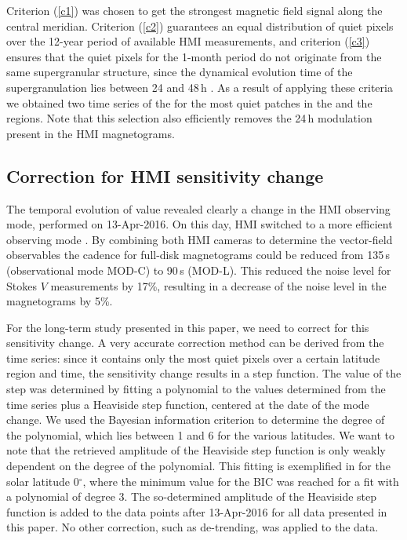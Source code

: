 \documentclass{aa}
\begin{document}
Criterion (\ref{c1}) was chosen to get the strongest magnetic field signal along the central meridian. 
Criterion
(\ref{c2}) guarantees an equal distribution of quiet pixels over the 12-year period of available HMI measurements, and 
criterion
(\ref{c3}) ensures that the quiet pixels for the 1-month period do not originate from the same supergranular structure, since the dynamical evolution time of the supergranulation lies between 24 and 48\,h \cite[]{2010LRSP....7....2R}. 
As a result of applying these criteria we obtained
two time series of the \brms{} for the most quiet patches in the \NW{} and the \IN{} regions. 
Note that this selection also efficiently removes the 24\,h modulation present in the HMI magnetograms.

\subsection{Correction for HMI sensitivity change\label{sensicorr}}

The temporal evolution of \inw{} \brms{} value
revealed clearly a change in the HMI observing mode, performed on 13-Apr-2016. On this day, HMI switched to a more efficient observing mode \cite[see][]{2018SoPh..293...45H,2014SoPh..289.3483H,2016SoPh..291.1887C}. By combining both HMI cameras to determine the vector-field observables the cadence for full-disk magnetograms could be reduced from 135\,s (observational mode MOD-C) to 90\,s (MOD-L). This reduced the noise level for Stokes $V$ measurements by 17\%, resulting in a decrease of the noise level in the \los{} magnetograms by 5\%.

For the long-term study presented in this paper, we need to correct for this sensitivity change. A very accurate correction method can be derived from the \inw{} time series: since it contains only the most quiet pixels over a certain latitude region and time, the sensitivity change results in a step function. The value of the step was determined by fitting a polynomial to the \brms{} values determined from the \inw{} time series plus a Heaviside step function, centered at the date of the mode change. We used the Bayesian information criterion \cite[BIC,][]{Stoica2004} to determine the degree of the polynomial, which lies between 1 and 6 for the various latitudes. We want to note that the retrieved amplitude of the Heaviside step function is only weakly dependent on the degree of the polynomial. This fitting is exemplified in  for the solar latitude 0$^\circ$, where the minimum value for the BIC was reached for a fit with a polynomial of 
degree 3. 
The so-determined amplitude of the Heaviside step function is added to the 
\brms{}
data points after 13-Apr-2016 for all data presented in this paper. No other correction, such as de-trending, was applied to the data.
\end{document}
